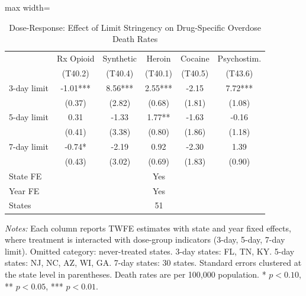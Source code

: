 \begin{table}[H]
\centering
\caption{Dose-Response: Effect of Limit Stringency on Drug-Specific Overdose Death Rates}
\begin{threeparttable}
\begin{adjustbox}{max width=\textwidth}
\begin{tabular}{lccccc}
\toprule
& \multicolumn{1}{c}{Rx Opioid} & \multicolumn{1}{c}{Synthetic} & \multicolumn{1}{c}{Heroin} & \multicolumn{1}{c}{Cocaine} & \multicolumn{1}{c}{Psychostim.} \\
& \multicolumn{1}{c}{(T40.2)} & \multicolumn{1}{c}{(T40.4)} & \multicolumn{1}{c}{(T40.1)} & \multicolumn{1}{c}{(T40.5)} & \multicolumn{1}{c}{(T43.6)} \\
\midrule
3-day limit & -1.01*** & 8.56*** & 2.55*** & -2.15 & 7.72*** \\
 & (0.37) & (2.82) & (0.68) & (1.81) & (1.08) \\[3pt]
5-day limit & 0.31 & -1.33 & 1.77** & -1.63 & -0.16 \\
 & (0.41) & (3.38) & (0.80) & (1.86) & (1.18) \\[3pt]
7-day limit & -0.74* & -2.19 & 0.92 & -2.30 & 1.39 \\
 & (0.43) & (3.02) & (0.69) & (1.83) & (0.90) \\[3pt]
\midrule
State FE & \multicolumn{5}{c}{Yes} \\
Year FE & \multicolumn{5}{c}{Yes} \\
States & \multicolumn{5}{c}{51} \\
\bottomrule
\end{tabular}
\end{adjustbox}
\begin{tablenotes}[flushleft]
\small
\item \textit{Notes:} Each column reports TWFE estimates with state and year fixed effects, where treatment is interacted with dose-group indicators (3-day, 5-day, 7-day limit). Omitted category: never-treated states. 3-day states: FL, TN, KY. 5-day states: NJ, NC, AZ, WI, GA. 7-day states: 30 states. Standard errors clustered at the state level in parentheses. Death rates are per 100,000 population. * $p<0.10$, ** $p<0.05$, *** $p<0.01$.
\end{tablenotes}
\end{threeparttable}
\label{tab:dose_response}
\end{table}
